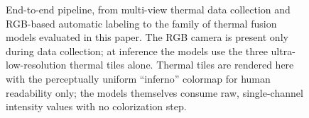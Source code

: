 \begin{figure}[!t]
  \centering
  \caption{End-to-end pipeline, from multi-view thermal data collection and
  RGB-based automatic labeling to the family of thermal fusion models evaluated
  in this paper. The RGB camera is present only during data collection; at
  inference the models use the three ultra-low-resolution thermal tiles alone.
  Thermal tiles are rendered here with the perceptually uniform ``inferno''
  colormap for human readability only; the models themselves consume raw,
  single-channel intensity values with no colorization step.}
  \label{fig:pipeline}
\end{figure}
